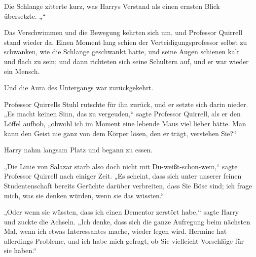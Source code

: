 Die Schlange zitterte kurz, was Harrys Verstand als einen ernsten Blick übersetzte. „“

Das Verschwimmen und die Bewegung kehrten sich um, und Professor Quirrell stand wieder da. Einen Moment lang schien der Verteidigungsprofessor selbst zu schwanken, wie die Schlange geschwankt hatte, und seine Augen schienen kalt und flach zu sein; und dann richteten sich seine Schultern auf, und er war wieder ein Mensch.

Und die Aura des Untergangs war zurückgekehrt.

Professor Quirrells Stuhl rutschte für ihn zurück, und er setzte sich darin nieder. „Es macht keinen Sinn, das zu vergeuden,“ sagte Professor Quirrell, als er den Löffel aufhob, „obwohl ich im Moment eine lebende Maus viel lieber hätte. Man kann den Geist nie ganz von dem Körper lösen, den er trägt, verstehen Sie?“

Harry nahm langsam Platz und begann zu essen.

\later

„Die Linie von Salazar starb also doch nicht mit Du-weißt-schon-wem,“ sagte Professor Quirrell nach einiger Zeit. „Es scheint, dass sich unter unserer feinen Studentenschaft bereits Gerüchte darüber verbreiten, dass Sie Böse sind; ich frage mich, was sie denken würden, wenn sie das wüssten.“

„Oder wenn sie wüssten, dass ich einen Dementor zerstört habe,“ sagte Harry und zuckte die Achseln. „Ich denke, dass sich die ganze Aufregung beim nächsten Mal, wenn ich etwas Interessantes mache, wieder legen wird. Hermine hat allerdings Probleme, und ich habe mich gefragt, ob Sie vielleicht Vorschläge für sie haben.“

